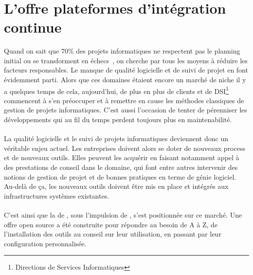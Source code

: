 \section{L'offre \og plateformes d'intégration continue \fg}
\label{section:pic}

\paragraph{}
Quand on sait que 70\% des projets informatiques ne respectent pas le planning initial ou se transforment en échecs~\cite{echec}, on cherche par tous les moyens à réduire les facteurs responsables.
Le manque de qualité logicielle et de suivi de projet en font évidemment parti.
Alors que ces domaines étaient encore un marché de niche il y a quelques temps de cela, aujourd'hui, de plus en plus de clients et de DSI\footnote{Directions de Services Informatiques} commencent à s'en préoccuper et à remettre en cause les méthodes classiques de gestion de projets informatiques.
C'est aussi l'occasion de tenter de pérenniser les développements qui au fil du temps perdent toujours plus en maintenabilité.

\paragraph{}
La qualité logicielle et le suivi de projets informatiques deviennent donc un véritable enjeu actuel.
Les entreprises doivent alors se doter de nouveaux process et de nouveaux outils. 
Elles peuvent les acquérir en faisant notamment appel à des prestations de conseil dans le domaine, qui font entre autres intervenir des notions de gestion de projet et de bonnes pratiques en terme de génie logiciel.
Au-delà de ça, les nouveaux outils doivent être mis en place et intégrés aux infrastructures systèmes existantes.

\paragraph{}
C'est ainsi que la \abusys{} de \asmile, sous l'impulsion de \agulet, s'est positionnée sur ce marché.
Une offre open source a été construite pour répondre au besoin de A à Z, de l'installation des outils au conseil sur leur utilisation, en passant par leur configuration personnalisée.














